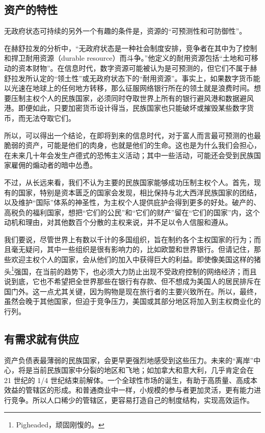\subsection{资产的特性}
无政府状态可持续的另外一个有趣的条件是，资源的“可预测性和可防御性”。

在赫舒拉发的分析中，“无政府状态是一种社会制度安排，竞争者在其中为了控制和捍卫耐用资源（durable resource）而斗争。”他定义的耐用资源包括“土地和可移动的资本财物”。在信息时代，数字资源可能被认为是可预测的，但它们不属于赫舒拉发所认定的“领土性”或无政府状态下的“耐用资源”。事实上，如果数字货币能以光速在地球上的任何地方转移，那么征服网络银行所在的领土就是浪费时间。想要压制主权个人的民族国家，必须同时夺取世界上所有的银行避风港和数据避风港。即便如此，只要加密货币设计得当，民族国家也只能破坏或摧毁某些数字货币，而无法夺取它们。

所以，可以得出一个结论，在即将到来的信息时代，对于富人而言最可预测的也最脆弱的资产，可能是他们的肉身，也就是他们的生命。这也是为什么我们会担心，在未来几十年会发生卢德式的恐怖主义活动；其中一些活动，可能还会受到民族国家雇佣的煽动者的暗中怂恿。

不过，从长远来看，我们不认为主要的民族国家能够成功压制主权个人。首先，现有的国家，特别是资本匮乏的国家会发现，相比保持与北大西洋民族国家的团结，以及维护“国际”体系的神圣性，为主权个人提供庇护会得到更多的好处。破产的、高税负的福利国家，想把“它们的公民”和“它们的财产”留在“它们的国家”内，这个动机和理由，对其他数百个分散的主权来说，并不足以令人信服和遵从。

我们要说，尽管世界上有数以千计的多国组织，旨在制约各个主权国家的行为；而且毫无疑问，其中一些组织是很有影响力的，比如欧盟和世界银行。但请记住，那些欢迎主权个人的国家，会从他们的加入中获得巨大的利益。即使像美国这样的猪头\footnote{Pigheaded，顽固刚愎的。}强国，在当前的趋势下，也必须大力防止出现不受政府控制的网络经济；而且说到底，它也不希望把全世界那些在银行有存款、但不想成为美国人的居民排斥在国门外。这一点尤其关键，因为购物是现在旅行者的主要兴致所在。所以，最终，虽然会晚于其他国家，但迫于竞争压力，美国或其部分地区将加入到主权商业化的行列。

\subsection{有需求就有供应}
资产负债表最薄弱的民族国家，会更早更强烈地感受到这些压力。未来的“离岸”中心，将是当前民族国家中分裂的地区和飞地；如加拿大和意大利，几乎肯定会在 21 世纪的 1/4 世纪结束前解体。一个全球性市场的诞生，有助于高质量、高成本效益的管辖区的形成。和普通商业中一样，小规模的参与者更加灵活，更有能力进行竞争。所以人口稀少的管辖区，更容易打造自己的制度结构，实现高效运作。

